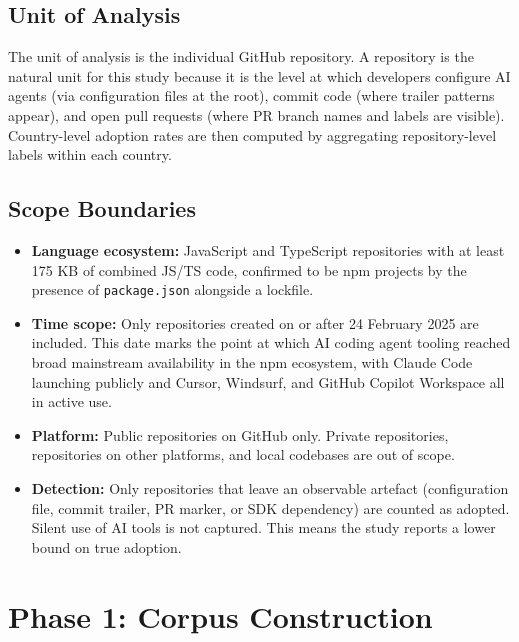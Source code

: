 \documentclass[12pt, a4paper]{article}
\begin{document}
\subsection{Unit of Analysis}

The unit of analysis is the individual GitHub repository. A repository is
the natural unit for this study because it is the level at which developers
configure AI agents (via configuration files at the root), commit code (where
trailer patterns appear), and open pull requests (where PR branch names and
labels are visible). Country-level adoption rates are then computed by
aggregating repository-level labels within each country.

\subsection{Scope Boundaries}

\begin{itemize}
  \item \textbf{Language ecosystem:} JavaScript and TypeScript repositories
        with at least 175 KB of combined JS/TS code, confirmed to be npm
        projects by the presence of \texttt{package.json} alongside a lockfile.
  \item \textbf{Time scope:} Only repositories created on or after 24 February
        2025 are included. This date marks the point at which AI coding agent
        tooling reached broad mainstream availability in the npm ecosystem,
        with Claude Code launching publicly and Cursor, Windsurf, and GitHub
        Copilot Workspace all in active use.
  \item \textbf{Platform:} Public repositories on GitHub only. Private
        repositories, repositories on other platforms, and local codebases
        are out of scope.
  \item \textbf{Detection:} Only repositories that leave an observable
        artefact (configuration file, commit trailer, PR marker, or SDK
        dependency) are counted as adopted. Silent use of AI tools is not
        captured. This means the study reports a lower bound on true adoption.
\end{itemize}

\section{Phase 1: Corpus Construction}
\end{document}
